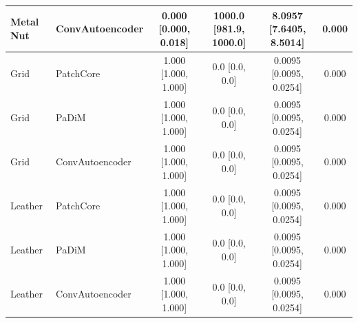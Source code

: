 \begin{table}[t]
{\begin{tabular}{llcccc}
Metal Nut & ConvAutoencoder & 0.000 [0.000, 0.018] & 1000.0 [981.9, 1000.0] & 8.0957 [7.6405, 8.5014] & 0.000 \\
\midrule
Grid & PatchCore & 1.000 [1.000, 1.000] & 0.0 [0.0, 0.0] & 0.0095 [0.0095, 0.0254] & 0.000 \\
Grid & PaDiM & 1.000 [1.000, 1.000] & 0.0 [0.0, 0.0] & 0.0095 [0.0095, 0.0254] & 0.000 \\
Grid & ConvAutoencoder & 1.000 [1.000, 1.000] & 0.0 [0.0, 0.0] & 0.0095 [0.0095, 0.0254] & 0.000 \\
\midrule
Leather & PatchCore & 1.000 [1.000, 1.000] & 0.0 [0.0, 0.0] & 0.0095 [0.0095, 0.0254] & 0.000 \\
Leather & PaDiM & 1.000 [1.000, 1.000] & 0.0 [0.0, 0.0] & 0.0095 [0.0095, 0.0254] & 0.000 \\
Leather & ConvAutoencoder & 1.000 [1.000, 1.000] & 0.0 [0.0, 0.0] & 0.0095 [0.0095, 0.0254] & 0.000 \\
\bottomrule
\end{tabular}}
\end{table}
